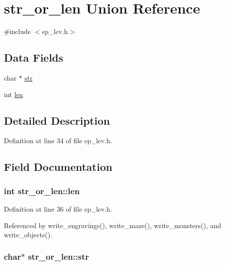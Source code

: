 \hypertarget{unionstr__or__len}{\section{str\+\_\+or\+\_\+len Union Reference}
\label{unionstr__or__len}
}


{\ttfamily \#include $<$sp\+\_\+lev.\+h$>$}

\subsection*{Data Fields}
\begin{DoxyCompactItemize}
\item 
char $\ast$ \hyperlink{unionstr__or__len_a5e463454e22eb53eaa7b740ebccecfce}{str}
\item 
int \hyperlink{unionstr__or__len_adec1f846eaf281ba750d96d01f05d833}{len}
\end{DoxyCompactItemize}


\subsection{Detailed Description}


Definition at line 34 of file sp\+\_\+lev.\+h.



\subsection{Field Documentation}
\hypertarget{unionstr__or__len_adec1f846eaf281ba750d96d01f05d833}{
\subsubsection[{len}]{\setlength{\rightskip}{0pt plus 5cm}int str\+\_\+or\+\_\+len\+::len}}\label{unionstr__or__len_adec1f846eaf281ba750d96d01f05d833}


Definition at line 36 of file sp\+\_\+lev.\+h.



Referenced by write\+\_\+engravings(), write\+\_\+maze(), write\+\_\+monsters(), and write\+\_\+objects().

\hypertarget{unionstr__or__len_a5e463454e22eb53eaa7b740ebccecfce}{
\subsubsection[{str}]{\setlength{\rightskip}{0pt plus 5cm}char$\ast$ str\+\_\+or\+\_\+len\+::str}}\label{unionstr__or__len_a5e463454e22eb53eaa7b740ebccecfce}



